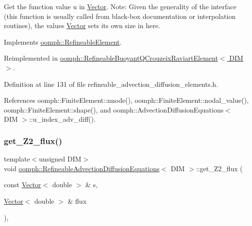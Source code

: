 Get the function value u in \hyperlink{classoomph_1_1Vector}{Vector}. Note\+: Given the generality of the interface (this function is usually called from black-\/box documentation or interpolation routines), the values \hyperlink{classoomph_1_1Vector}{Vector} sets its own size in here. 



Implements \hyperlink{classoomph_1_1RefineableElement_ada6f0efe831ffefb1d2829ce01d45bfc}{oomph\+::\+Refineable\+Element}.



Reimplemented in \hyperlink{classoomph_1_1RefineableBuoyantQCrouzeixRaviartElement_af178c04f0e6ee09a5d05574fcd68ac41}{oomph\+::\+Refineable\+Buoyant\+Q\+Crouzeix\+Raviart\+Element$<$ D\+I\+M $>$}.



Definition at line 131 of file refineable\+\_\+advection\+\_\+diffusion\+\_\+elements.\+h.



References oomph\+::\+Finite\+Element\+::nnode(), oomph\+::\+Finite\+Element\+::nodal\+\_\+value(), oomph\+::\+Finite\+Element\+::shape(), and oomph\+::\+Advection\+Diffusion\+Equations$<$ D\+I\+M $>$\+::u\+\_\+index\+\_\+adv\+\_\+diff().

\mbox{\label{classoomph_1_1RefineableAdvectionDiffusionEquations_ae28af2d25f78d02a4cbe6b382dcc9546}} 
\subsubsection{\texorpdfstring{get\+\_\+\+Z2\+\_\+flux()}{get\_Z2\_flux()}}
{\footnotesize\ttfamily template$<$unsigned D\+IM$>$ \\
void \hyperlink{classoomph_1_1RefineableAdvectionDiffusionEquations}{oomph\+::\+Refineable\+Advection\+Diffusion\+Equations}$<$ D\+IM $>$\+::get\+\_\+\+Z2\+\_\+flux (\begin{DoxyParamCaption}\item[{const \hyperlink{classoomph_1_1Vector}{Vector}$<$ double $>$ \&}]{s,  }\item[{\hyperlink{classoomph_1_1Vector}{Vector}$<$ double $>$ \&}]{flux }\end{DoxyParamCaption})\hspace{0.3cm}{\ttfamily [inline]}, {\ttfamily [virtual]}}



